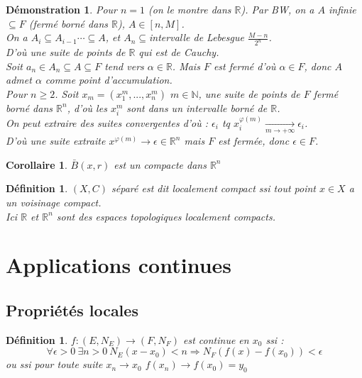 \documentclass[a4paper, oneside]{report}
\theoremstyle{break}
\newtheorem{defi}[thm]{Définition}
\newtheorem{cor}[thm]{Corollaire}
\newtheorem*{demo}{Démonstration}
\newcommand{\R}{\mathbb{R}}
\newcommand{\N}{\mathbb{N}}
\begin{document}
\begin{demo}
Pour $n=1$ (on le montre dans $\R$). Par BW, on a $A$ infinie $\subseteq F$ (fermé borné dans $\R$), $A\in [n,M]$.\\
On a $A_i\subseteq A_{i-1}\cdots \subseteq A$, et $A_n \subseteq $intervalle de Lebesgue $\frac{M-n}{2^n}$.\\
D'où une suite de points de $\R$ qui est de Cauchy.\\
Soit $a_n\in A_n\subseteq A \subseteq F$ tend vers $\alpha \in \R$. Mais $F$ est fermé d'où $\alpha \in F$, donc $A$ admet $\alpha$ comme point d'accumulation.\\
 
Pour $n\geq 2$. Soit $x_m = (x_1^m,...,x_n^m)$ $m\in \N$, une suite de points de $F$ fermé borné dans $\R^n$, d'où les $x_i^m$ sont dans un intervalle borné de $\R$.\\
On peut extraire des suites convergentes d'où : $\epsilon_i$ tq $x_i^{\varphi(m)}\underset{m \rightarrow +\infty}{\rightarrow }\epsilon_i$.\\
D'où une suite extraite $x^{\varphi(m)}\rightarrow \epsilon \in \R^n$ mais $F$ est fermée, donc $\epsilon \in F$.\end{demo}


\begin{cor}
$\bar{B}(x,r)$ est un compacte dans $\R^n$
\end{cor}


\begin{defi}
$(X,C)$ séparé est dit localement compact ssi tout point $x\in X$ a un voisinage compact.\\
Ici $\R$ et $\R^n$ sont des espaces topologiques localement compacts.
\end{defi}


\section{Applications continues}

\subsection{Propriétés locales}

\begin{defi}
$f:(E,N_E)\rightarrow (F,N_F)$ est continue en $x_0$ ssi :
$$\forall \epsilon >0~\exists n>0~N_E(x-x_0)<n\Rightarrow N_F(f(x)-f(x_0)) < \epsilon$$
ou ssi pour toute suite $x_n\rightarrow x_0$ $f(x_n)\rightarrow f(x_0)=y_0$
\end{defi}
\end{document}
